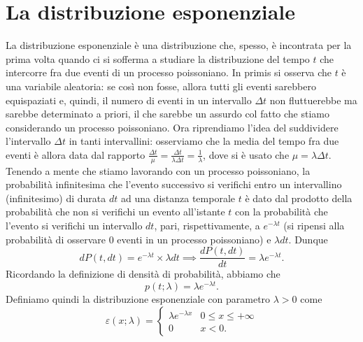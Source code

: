 \documentclass{report}
\begin{document}
\section{La distribuzione esponenziale}
La distribuzione esponenziale è una distribuzione che, spesso, è incontrata per la prima volta quando ci si sofferma a studiare la distribuzione del tempo $t$ che intercorre fra due eventi di un processo poissoniano. In primis si osserva che $t$ è una variabile aleatoria: se così non fosse, allora tutti gli eventi sarebbero equispaziati e, quindi, il numero di eventi in un intervallo $\Delta t$ non fluttuerebbe ma sarebbe determinato a priori, il che sarebbe un assurdo col fatto che stiamo considerando un processo poissoniano. Ora riprendiamo l'idea del suddividere l'intervallo $\Delta t$ in tanti intervallini: osserviamo che la media del tempo fra due eventi è allora data dal rapporto $\frac{\Delta t}{\mu} = \frac{\Delta t}{\lambda \Delta t} = \frac{1}{\lambda}$, dove si è usato che $\mu = \lambda \Delta t$. Tenendo a mente che stiamo lavorando con un processo poissoniano, la probabilità infinitesima che l'evento successivo si verifichi entro un intervallino (infinitesimo) di durata $dt$ ad una distanza temporale $t$ è dato dal prodotto della probabilità che non si verifichi un evento all'istante $t$ con la probabilità che l'evento si verifichi un intervallo $dt$, pari, rispettivamente, a $e^{-\lambda t}$ (si ripensi alla probabilità di osservare $0$ eventi in un processo poissoniano) e $\lambda dt$. Dunque
$$
	dP(t, dt) = e^{-\lambda t} \times \lambda dt \implies \frac{dP(t, dt)}{dt} = \lambda e^{-\lambda t}.
$$
Ricordando la definizione di densità di probabilità, abbiamo che
$$
	p(t; \lambda) = \lambda e^{- \lambda t}.
$$
Definiamo quindi la distribuzione esponenziale con parametro $\lambda > 0$ come
$$
\varepsilon(x; \lambda) = \begin{cases}
	\lambda e^{-\lambda x} & 0 \leq x \leq +\infty \\
	0 & x < 0.
\end{cases}
$$
\end{document}
